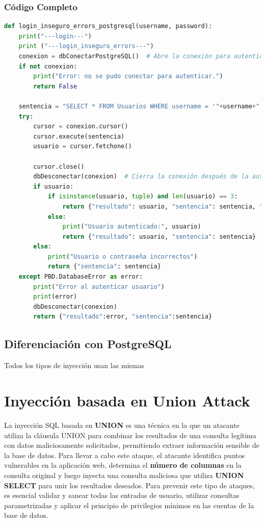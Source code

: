 \documentclass[a4paper,12pt]{article}
\begin{document}
\subsubsection{Código Completo}
\begin{lstlisting}[language=Python]
def login_inseguro_errors_postgresql(username, password):
    print("---login---")
    print ("---login_inseguro_errors---")
    conexion = dbConectarPostgreSQL()  # Abre la conexión para autenticación
    if not conexion:
        print("Error: no se pudo conectar para autenticar.")
        return False

    sentencia = "SELECT * FROM Usuarios WHERE username = '"+username+"' AND password = '"+password+"'"
    try:
        cursor = conexion.cursor()
        cursor.execute(sentencia)
        usuario = cursor.fetchone()

        cursor.close()
        dbDesconectar(conexion)  # Cierra la conexión después de la autenticación
        if usuario:
            if isinstance(usuario, tuple) and len(usuario) == 3:
                return {"resultado": usuario, "sentencia": sentencia, "auth": "true"}
            else:
                print("Usuario autenticado:", usuario)
                return {"resultado": usuario, "sentencia": sentencia}
        else:
            print("Usuario o contraseña incorrectos")
            return {"sentencia": sentencia}
    except PBD.DatabaseError as error:
        print("Error al autenticar usuario")
        print(error)
        dbDesconectar(conexion)
        return {"resultado":error, "sentencia":sentencia}
\end{lstlisting}

\subsection{Diferenciación con PostgreSQL}

Todos los tipos de inyección usan las mismas





\section{Inyección basada en Union Attack}
La inyección SQL basada en \textbf{UNION} es una técnica en la que un atacante utiliza la cláusula UNION para combinar los resultados de una consulta legítima con datos maliciosamente solicitados, permitiendo extraer información sensible de la base de datos. 
Para llevar a cabo este ataque, el atacante identifica puntos vulnerables en la aplicación web, determina el \textbf{número de columnas} en la consulta original y luego inyecta una consulta maliciosa que utiliza \textbf{UNION SELECT} para unir los resultados deseados. 
Para prevenir este tipo de ataques, es esencial validar y sanear todas las entradas de usuario, utilizar consultas parametrizadas y aplicar el principio de privilegios mínimos en las cuentas de la base de datos.
\end{document}
